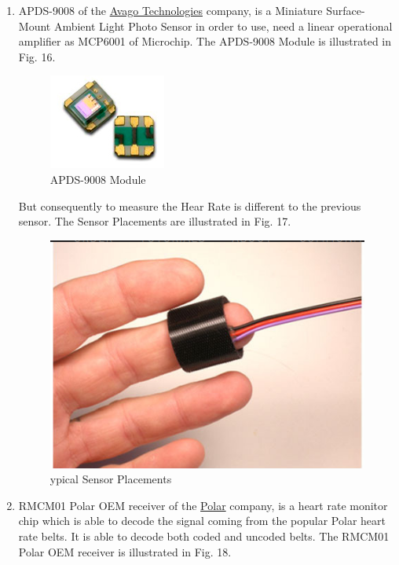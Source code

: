 \documentclass[10pt,journal,compsoc]{IEEEtran}
\begin{document}
\begin{enumerate}[\IEEEsetlabelwidth{3)}]
%

\item APDS-9008 of the \href{http://www.avagotech.com}{Avago Technologies} company, is a Miniature Surface-Mount Ambient Light Photo Sensor in order to use, need a linear operational amplifier as MCP6001  of Microchip. The APDS-9008 Module is illustrated in Fig. 16.

\begin{figure}[h]
  \centering
  \captionsetup{justification=centering}
  \includegraphics[scale=.45]{es15}
  \caption{APDS-9008 Module}
  \label{fig:fig16}
\end{figure}

%

But consequently to measure the Hear Rate is different to the previous sensor. The Sensor Placements are illustrated in Fig. 17.

\begin{figure}[h]
  \centering
  \captionsetup{justification=centering}
  \includegraphics[scale=.45]{es16}
  \caption{ypical Sensor Placements}
  \label{fig:fig17}
\end{figure}

%

\item RMCM01 Polar OEM receiver of the \href{https://www.polar.com/it}{Polar} company, is a heart rate monitor chip which is able to decode the signal coming from the popular Polar heart rate belts.  It is able to decode both coded and uncoded belts. The RMCM01 Polar OEM receiver is illustrated in Fig. 18.


\end{enumerate}
\end{document}
